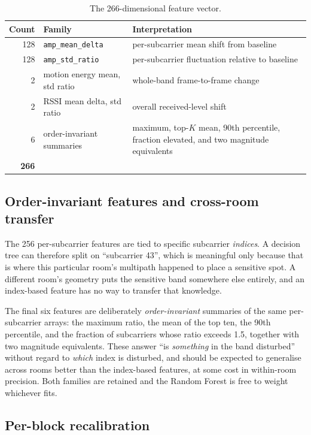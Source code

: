 \documentclass[11pt,a4paper]{article}
\newcommand{\code}[1]{\texttt{\small #1}}
\begin{document}
\begin{table}[H]
\centering
\caption{The 266-dimensional feature vector.}
\label{tab:features}
\begin{tabularx}{\linewidth}{@{}rlX@{}}
\toprule
\textbf{Count} & \textbf{Family} & \textbf{Interpretation} \\
\midrule
128 & \code{amp\_mean\_delta} & per-subcarrier mean shift from baseline \\
128 & \code{amp\_std\_ratio}  & per-subcarrier fluctuation relative to baseline \\
2   & motion energy mean, std ratio & whole-band frame-to-frame change \\
2   & RSSI mean delta, std ratio & overall received-level shift \\
6   & order-invariant summaries & maximum, top-$K$ mean, 90th percentile,
      fraction elevated, and two magnitude equivalents \\
\midrule
\textbf{266} & & \\
\bottomrule
\end{tabularx}
\end{table}

\subsection{Order-invariant features and cross-room transfer}

The 256 per-subcarrier features are tied to specific subcarrier
\emph{indices}. A decision tree can therefore split on ``subcarrier 43'', which
is meaningful only because that is where this particular room's multipath
happened to place a sensitive spot. A different room's geometry puts the
sensitive band somewhere else entirely, and an index-based feature has no way
to transfer that knowledge.

The final six features are deliberately \emph{order-invariant} summaries of the
same per-subcarrier arrays: the maximum ratio, the mean of the top ten, the
90th percentile, and the fraction of subcarriers whose ratio exceeds 1.5,
together with two magnitude equivalents. These answer ``is \emph{something} in
the band disturbed'' without regard to \emph{which} index is disturbed, and
should be expected to generalise across rooms better than the index-based
features, at some cost in within-room precision. Both families are retained and
the Random Forest is free to weight whichever fits.

\subsection{Per-block recalibration}
\end{document}
